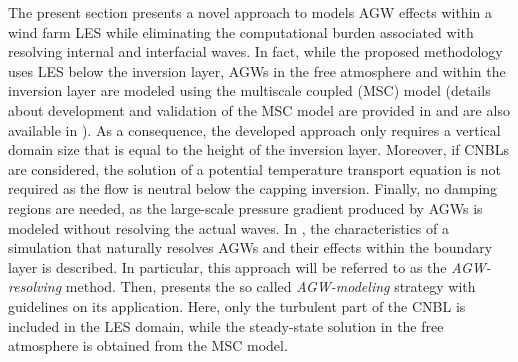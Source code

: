 The present section presents a novel approach to models AGW effects within a wind farm LES while eliminating the computational burden associated with resolving internal and interfacial waves. In fact, while the proposed methodology uses LES below the inversion layer, AGWs in the free atmosphere and within the inversion layer are modeled using the multiscale coupled (\acrshort{MSC}) model (details about development and validation of the MSC model are provided in  and are also available in \citealp{StipaEtAl2023b}). As a consequence, the developed approach only requires a vertical domain size that is equal to the height of the inversion layer. Moreover, if CNBLs are considered, the solution of a potential temperature transport equation is not required as the flow is neutral below the capping inversion. Finally, no damping regions are needed, as the large-scale pressure gradient produced by AGWs is modeled without resolving the actual waves. In , the characteristics of a simulation that naturally resolves AGWs and their effects within the boundary layer is described. In particular, this approach will be referred to as the \textit{AGW-resolving} method. Then,  presents the so called \textit{AGW-modeling} strategy with guidelines on its application. Here, only the turbulent part of the CNBL is included in the LES domain, while the steady-state solution in the free atmosphere is obtained from the MSC model.

